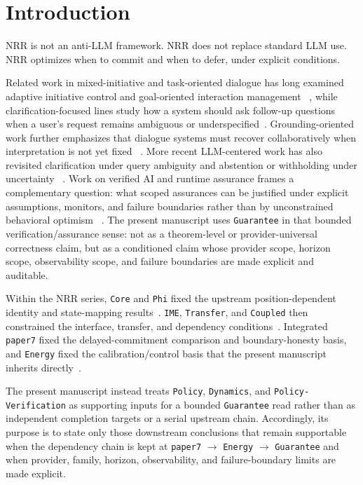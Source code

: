 \documentclass[11pt]{article}
\renewcommand{\_}{\textunderscore\hspace{0pt}}
\begin{document}
\section{Introduction}

NRR is not an anti-LLM framework. NRR does not replace standard LLM use. NRR
optimizes when to commit and when to defer, under explicit conditions.

Related work in mixed-initiative and task-oriented dialogue has long examined
adaptive initiative control and goal-oriented interaction management
~\cite{chucarroll2000mimic,wen2017taskdialogue}, while clarification-focused lines
study how a system should ask follow-up questions when a user's request remains
ambiguous or underspecified~\cite{deboni2003clarification,rao2018evpi,hu2020interactive}. Grounding-oriented work further emphasizes that dialogue systems
must recover collaboratively when interpretation is not yet fixed
~\cite{benotti2021groundedclarifications,benotti2021grounding}. More recent
LLM-centered work has also revisited clarification under query ambiguity and
abstention or withholding under uncertainty
~\cite{sahay-etal-2025-ask,wen-etal-2025-know,madhusudhan-etal-2025-llms}.
Work on verified AI and runtime assurance frames a complementary question:
what scoped assurances can be justified under explicit assumptions, monitors,
and failure boundaries rather than by unconstrained behavioral optimism
~\cite{seshia2022verifiedai,desai2019soter}. The present manuscript uses
\texttt{Guarantee} in that bounded verification/assurance sense: not as a
theorem-level or provider-universal correctness claim, but as a conditioned
claim whose provider scope, horizon scope, observability scope, and failure
boundaries are made explicit and auditable.

Within the NRR series, \texttt{Core} and \texttt{Phi} fixed the upstream
position-dependent identity and state-mapping results~\cite{saito2025nrr,saito2026phi}.
\texttt{IME}, \texttt{Transfer}, and \texttt{Coupled} then constrained the
interface, transfer, and dependency conditions~\cite{saito2026ime,saito2026transfer,saito2026coupled}.
Integrated \texttt{paper7} fixed the delayed-commitment comparison and
boundary-honesty basis, and \texttt{Energy} fixed the calibration/control basis
that the present manuscript inherits directly~\cite{saito2026principles,saito2026energy}.

The present manuscript instead treats \texttt{Policy}, \texttt{Dynamics}, and
\texttt{Policy-Verification} as supporting inputs for a bounded
\texttt{Guarantee} read rather than as independent completion targets
or a serial upstream chain. Accordingly, its purpose is to state only those
downstream conclusions that remain supportable when the dependency chain is
kept at \texttt{paper7} $\rightarrow$ \texttt{Energy} $\rightarrow$
\texttt{Guarantee} and when
provider, family, horizon, observability, and failure-boundary limits are made
explicit.
\end{document}
